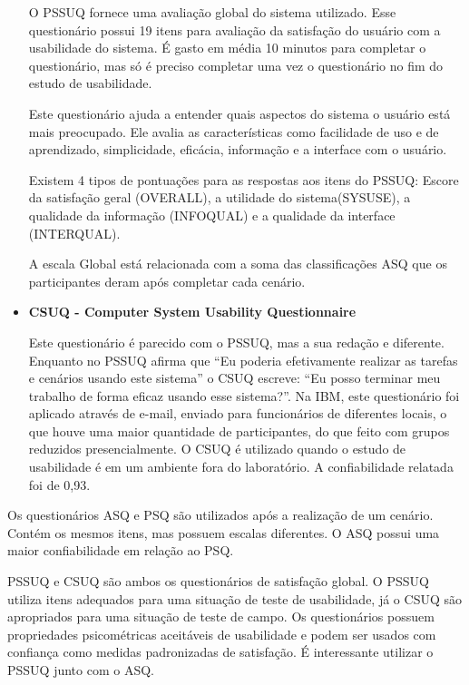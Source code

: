 \begin{itemize}
	O PSSUQ fornece uma avaliação global do sistema utilizado. Esse questionário possui 19 itens para avaliação da satisfação do usuário com a usabilidade do sistema. É gasto em média 10 minutos para completar o questionário, mas só é preciso completar uma vez o questionário no fim do estudo de usabilidade. ~\cite{lewis1995ibm} 

	Este questionário ajuda a entender quais aspectos do sistema o usuário está mais preocupado. Ele avalia as características como facilidade de uso e de aprendizado, simplicidade, eficácia, informação e a interface com o usuário.

	Existem 4 tipos de pontuações para as respostas aos itens do PSSUQ: Escore da satisfação geral (OVERALL), a utilidade do sistema(SYSUSE), a qualidade da  informação (INFOQUAL) e a qualidade da interface (INTERQUAL). 

A escala Global está relacionada com a soma das classificações ASQ que os participantes deram após completar cada cenário. 

\item \textbf{CSUQ - Computer System Usability Questionnaire}

	Este questionário é parecido com o PSSUQ, mas a sua redação e diferente. Enquanto no PSSUQ afirma que “Eu poderia efetivamente realizar as tarefas e cenários usando este sistema” o CSUQ escreve: “Eu posso terminar meu trabalho de forma eficaz usando esse sistema?”. Na IBM, este questionário foi aplicado através de e-mail, enviado para funcionários de diferentes locais, o que houve uma maior quantidade de participantes, do que feito com grupos reduzidos presencialmente.
	O CSUQ é utilizado quando o estudo de usabilidade é em um ambiente fora do laboratório. A confiabilidade relatada foi de 0,93.

\end{itemize}


	Os questionários ASQ e PSQ são utilizados após a realização de um cenário. Contém os mesmos itens, mas possuem escalas diferentes. O ASQ possui uma maior confiabilidade em relação ao PSQ. 

	PSSUQ e CSUQ são ambos os questionários de satisfação global. O PSSUQ utiliza itens adequados para uma situação de teste de usabilidade, já o CSUQ são apropriados para uma situação de teste de campo. Os questionários possuem propriedades psicométricas aceitáveis de usabilidade e podem ser usados com confiança como medidas padronizadas de satisfação. É interessante utilizar o PSSUQ junto com o ASQ.


